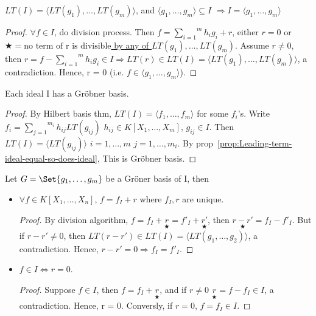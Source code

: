 \begin{prop} \label{prop:Leading-term-ideal-equal-so-does-ideal}
  $LT(I) = \langle LT(g_1),\dots,LT(g_m) \rangle$, and $\langle g_1,\dots,g_m \rangle \subseteq I$ $ \Rightarrow I = \langle g_1,\dots,g_m \rangle$
  \begin{proof}
    $\forall f \in I$, do division process. Then $f = \overset{m}{\underset{i = 1}{\sum}} h_ig_i+r$, either $r=0$ or \uline{$\bigstar = \text{no term of r is divisible}$ by any of $LT(g_1),\dots,LT(g_m)$}. Assume $r \neq 0$, then $r = f - \overset{m}{\underset{i = 1}{\sum}} h_i g_i \in I \Rightarrow LT(r) \in LT(I) = \langle LT(g_1),\dots, LT(g_m) \rangle$, a contradiction. Hence, r = 0 (i.e. $f\in \langle g_1,\dots,g_m \rangle$).
  \end{proof}
\end{prop}

\begin{theorem} \label{thm:Grobner_existense}
  Each ideal I has a Gr\"{o}bner basis.
  \begin{proof}
    By Hilbert basis thm, $LT(I) = \langle f_1,\dots,f_m \rangle$ for some $f_i$'s. Write $f_i = \overset{m_i}{\underset{j = 1}{\sum}}h_{ij}LT(g_{ij})$ $h_{ij} \in K[X_1,\dots,X_m]$, $g_{ij} \in I$. Then $LT(I) = \langle LT(g_{ij}) \rangle$ $i=1,\dots,m$ $j=1,\dots,m_i$. By prop~\ref{prop:Leading-term-ideal-equal-so-does-ideal}, This is Gr\"{o}bner basis.
  \end{proof}
\end{theorem}

\begin{theorem} \label{thm:Grobner_property}
  Let $G = \Set{g_1,\dots,g_m}$ be a Gr\"{o}ner basis of I, then
  \begin{itemize}
    \item $\forall f \in K[X_1,\dots,X_n]$, $f = f_I + r$ where $f_I,r$ are unique.
      \begin{proof}
        By division algorithm, $f = f_I +\underset{\bigstar}{r} = f'_I+\underset{\bigstar}{r'}$, then $\underset{\bigstar}{r-r'} = f_I-f'_I$. But if $r-r' \neq 0$, then $LT(r-r') \in LT(I) = \langle LT(g_1,\dots,g_2) \rangle$, a contradiction. Hence, $r-r' = 0\Rightarrow f_I = f'_I$.
      \end{proof}
    \item $f \in I \iff r=0$.
      \begin{proof}
        Suppose $f \in I$, then $f = f_I + \underset{\bigstar}{r}$, and if $r\neq 0$ $\underset{\bigstar}{r} = f - f_I\in I$, a contradiction. Hence, r = 0. Conversly, if $r = 0$, $f = f_I \in I$. 
      \end{proof}
  \end{itemize}
\end{theorem}



